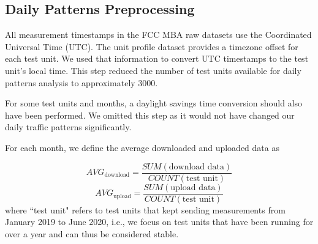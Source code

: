 \documentclass[conference,10pt]{IEEEtran}
\begin{document}
\subsection{Daily Patterns Preprocessing}

All measurement timestamps in the FCC MBA raw datasets use the Coordinated Universal Time (UTC). The unit profile dataset provides a timezone offset for each test unit. We used that information to convert UTC timestamps to the test unit's local time. This step reduced the number of test units available for daily patterns analysis to approximately 3000.

For some test units and months, a daylight savings time conversion should also have been performed. We omitted this step as it would not have changed our daily traffic patterns significantly.

For each month, we define the average downloaded and uploaded data as

\begin{equation}
    AVG_{\text{download}} =\frac{SUM(\text{download data})}{COUNT(\text{test unit})}
\end{equation}
\begin{equation}
    AVG_{\text{upload}} =\frac{SUM(\text{upload data})}{COUNT(\text{test unit})}
\end{equation}
where ``test unit" refers to test units that kept sending measurements from January 2019 to June 2020, i.e., we focus on test units that have been running for over a year and can thus be considered stable.







\end{document}
